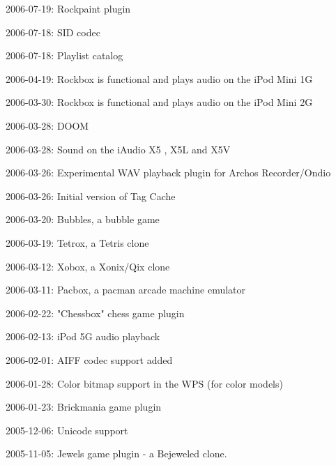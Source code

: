 \begin{changelog}
\item 2006-07-19: Rockpaint plugin
\item 2006-07-18: SID codec
\item 2006-07-18: Playlist catalog
\item 2006-04-19: Rockbox is functional and plays audio on the iPod Mini 1G
\item 2006-03-30: Rockbox is functional and plays audio on the iPod Mini 2G
\item 2006-03-28: DOOM
\item 2006-03-28: Sound on the iAudio X5 , X5L and X5V
\item 2006-03-26: Experimental WAV playback plugin for Archos Recorder/Ondio
\item 2006-03-26: Initial version of Tag Cache
\item 2006-03-20: Bubbles, a bubble game
\item 2006-03-19: Tetrox, a Tetris clone
\item 2006-03-12: Xobox, a Xonix/Qix clone
\item 2006-03-11: Pacbox, a pacman arcade machine emulator
\item 2006-02-22: "Chessbox" chess game plugin
\item 2006-02-13: iPod 5G audio playback
\item 2006-02-01: AIFF codec support added
\item 2006-01-28: Color bitmap support in the WPS (for color models)
\item 2006-01-23: Brickmania game plugin
\item 2005-12-06: Unicode support
\item 2005-11-05: Jewels game plugin - a Bejeweled clone.
\end{changelog}

